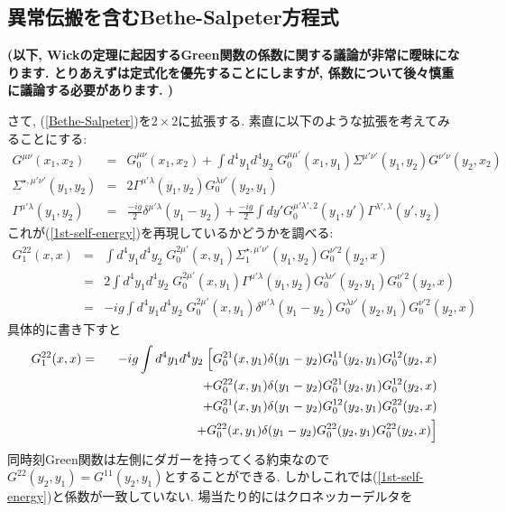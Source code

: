 \documentclass[10.5pt,a4paper]{jreport}
\begin{document}
\subsection{異常伝搬を含むBethe-Salpeter方程式}
\textbf{(以下, Wickの定理に起因するGreen関数の係数に関する議論が非常に曖昧になります. とりあえずは定式化を優先することにしますが, 係数について後々慎重に議論する必要があります. )}

さて, (\ref{Bethe-Salpeter})を$2\times 2$に拡張する. 素直に以下のような拡張を考えてみることにする:
\begin{eqnarray}
  G^{\mu\nu}(x_1, x_2) &=& G_0^{\mu\nu}(x_1, x_2) + \int d^4y_1d^4y_2\;G_0^{\mu\mu'}(x_1, y_1)\Sigma^{\mu'\nu'}(y_1, y_2)G^{\nu'\nu}(y_2, x_2)\\
  \Sigma^{\star, \mu'\nu'}(y_1, y_2) &=& 2\Gamma^{\mu'\lambda}(y_1, y_2)G_0^{\lambda\nu'}(y_2, y_1)\\
  \Gamma^{\mu'\lambda}(y_1, y_2) &=& \frac{-ig}{2}\delta^{\mu'\lambda}(y_1 - y_2) + \frac{-ig}{2}\int dy'G_0^{\mu'\lambda', 2}(y_1, y')\Gamma^{\lambda', \lambda}(y', y_2)
\end{eqnarray}
これが(\ref{1st-self-energy})を再現しているかどうかを調べる:
\begin{eqnarray}
  G^{22}_1(x, x) &=& \int d^4y_1d^4y_2\;G_0^{2\mu'}(x, y_1)\Sigma_1^{\star, \mu'\nu'}(y_1, y_2)G_0^{\nu'2}(y_2, x)\\
  &=&  2\int d^4y_1d^4y_2\;G_0^{2\mu'}(x, y_1)\Gamma^{\mu'\lambda}(y_1, y_2)G_0^{\lambda\nu'}(y_2, y_1)G_0^{\nu'2}(y_2, x)\\
  &=& -ig\int d^4y_1d^4y_2\;G_0^{2\mu'}(x, y_1)\delta^{\mu'\lambda}(y_1 - y_2)G_0^{\lambda\nu'}(y_2, y_1)G_0^{\nu'2}(y_2, x)
\end{eqnarray}
具体的に書き下すと
\begin{eqnarray}
  G^{22}_1(x, x) &=& -ig\int d^4y_1d^4y_2\;\Bigl[G_0^{21}(x, y_1)\delta(y_1 - y_2)G_0^{11}(y_2, y_1)G_0^{12}(y_2, x)\\
    && \hspace{2.5cm} + G_0^{22}(x, y_1)\delta(y_1 - y_2)G_0^{21}(y_2, y_1)G_0^{12}(y_2, x)\\
    && \hspace{2.5cm} + G_0^{21}(x, y_1)\delta(y_1 - y_2)G_0^{12}(y_2, y_1)G_0^{22}(y_2, x)\\
    && \hspace{2.5cm} + G_0^{22}(x, y_1)\delta(y_1 - y_2)G_0^{22}(y_2, y_1)G_0^{22}(y_2, x)\Bigr]
\end{eqnarray}
同時刻Green関数は左側にダガーを持ってくる約束なので$G^{22}(y_2, y_1) = G^{11}(y_2, y_1)$とすることができる. しかしこれでは(\ref{1st-self-energy})と係数が一致していない. 場当たり的にはクロネッカーデルタを
\end{document}
